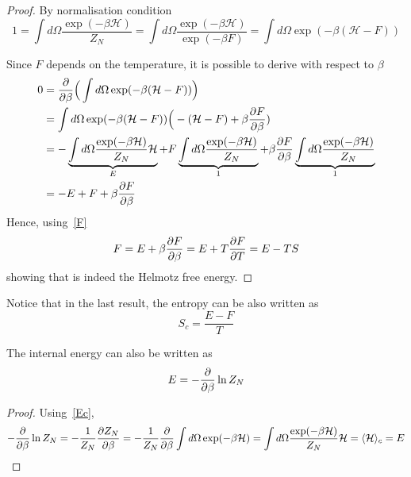     \begin{proof}
        By normalisation condition 
        \begin{equation*}
            1 = \int d\Omega \frac{\exp(-\beta \mathcal H)}{Z_N} = \int d\Omega \frac{\exp(-\beta \mathcal H)}{\exp(-\beta F)} = \int d\Omega \exp (- \beta (\mathcal H - F))
        \end{equation*}

        Since $F$ depends on the temperature, it is possible to derive with respect to $\beta$
        \begin{equation*}
        \begin{aligned}
            0 & = \frac{\partial}{\partial\beta} \Big ( \int d\Omega \exp (- \beta (\mathcal H - F)) \Big) \\ & = \int d\Omega \exp (-\beta (\mathcal H - F)) \Big (-(\mathcal H - F) + \beta \frac{\partial F}{\partial\beta}) \\ & = - \underbrace{\int d\Omega \frac{\exp(-\beta \mathcal H)}{Z_N} \mathcal H}_{E} + F \underbrace{\int d\Omega \frac{\exp(-\beta \mathcal H)}{Z_N}}_{1} + \beta \frac{\partial F}{\partial\beta} \underbrace{\int d\Omega \frac{\exp(-\beta \mathcal H)}{Z_N}}_{1} \\ & = - E + F + \beta \frac{\partial F}{\partial\beta}
        \end{aligned}
        \end{equation*}
        Hence, using~\eqref{F}
        \begin{equation*}
            F = E + \beta \frac{\partial F}{\partial\beta} = E + T \frac{\partial F}{\partial T} = E - TS
        \end{equation*}
        showing that is indeed the Helmotz free energy.
    \end{proof}

    Notice that in the last result, the entropy can be also written as 
    \begin{equation} \label{can:s}
        S_c = \frac{E - F}{T}
    \end{equation}
    
    The internal energy can also be written as 
    \begin{equation}\label{can:e}
        E = - \frac{\partial}{\partial\beta} \ln Z_N
    \end{equation}

    \begin{proof}
        Using~\eqref{Ec},
        \begin{equation*}
            - \frac{\partial}{\partial\beta} \ln Z_N = - \frac{1}{Z_N} \frac{\partial Z_N}{\partial\beta} = - \frac{1}{Z_N} \frac{\partial}{\partial\beta} \int d\Omega \exp (-\beta \mathcal H) = \int d\Omega \frac{\exp(-\beta \mathcal H)}{Z_N}  \mathcal H = \langle\mathcal H\rangle_{c} = E
        \end{equation*}
    \end{proof}

